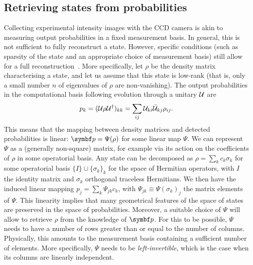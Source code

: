 \subsection{Retrieving states from probabilities}

Collecting experimental intensity images with the \ac{CCD} camera is akin to measuring output probabilities in a fixed measurement basis.
In general, this is not sufficient to fully reconstruct a state.
However, specific conditions (such as sparsity of the state and an appropriate choice of measurement basis) still allow for a full reconstruction~\cite{banchi2018multiphoton}.
More specifically, let $\rho$ be the density matrix characterising a state, and let us assume that this state is low-rank (that is, only a small number $n$ of eigenvalues of $\rho$ are non-vanishing).
The output probabilities in the computational basis following evolution through a unitary ${\mathcal{U}}$ are
\begin{equation}
	p_k = ({\mathcal{U}}\rho{\mathcal{U}}^\dagger)_{kk}
	    = \sum_{ij}{\mathcal{U}}_{ki}\bar{{\mathcal{U}}}_{kj}\rho_{ij}.
\end{equation}
This means that the mapping between density matrices and detected probabilities is linear: $\bs p=\Psi(\rho)$ for some linear map $\Psi$.
We can represent $\Psi$ as a (generally non-square) matrix, for example via its action on the coefficients of $\rho$ in some operatorial basis.
Any state can be decomposed as $\rho=\sum_k c_k \sigma_k$ for some operatorial basis $\{I\}\cup \{\sigma_k\}_k$ for the space of Hermitian operators, with $I$ the identity matrix and $\sigma_k$ orthogonal traceless Hermitians. We then have the induced linear mapping $p_j = \sum_k \Psi_{jk}c_k$, with $\Psi_{jk}\equiv\Psi(\sigma_k)_j$ the matrix elements of $\Psi$.
This linearity implies that many geometrical features of the space of states are preserved in the space of probabilities. Moreover, a suitable choice of $\Psi$ will allow to retrieve $\rho$ from the knowledge of $\bs p$.
For this to be possible, $\Psi$ needs to have a number of rows greater than or equal to the number of columns. Physically, this amounts to the measurement basis containing a sufficient number of elements. More specifically, $\Psi$ needs to be \emph{left-invertible}, which is the case when its columns are linearly independent.

